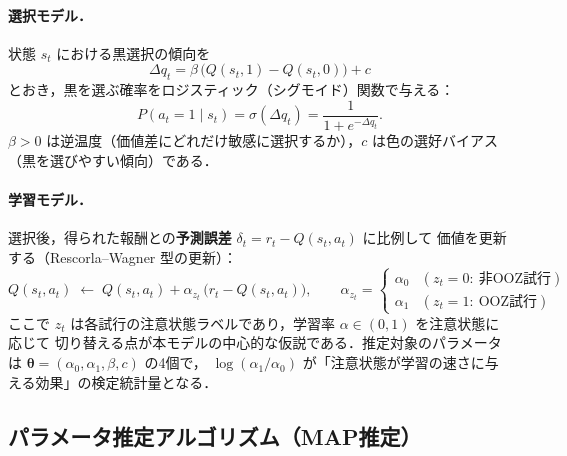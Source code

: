 \documentclass[a4paper,11pt]{jsarticle}
\begin{document}
\paragraph{選択モデル．}
状態 $s_t$ における黒選択の傾向を
\begin{equation}
  \Delta q_t = \beta\,\bigl(Q(s_t,1) - Q(s_t,0)\bigr) + c
\end{equation}
とおき，黒を選ぶ確率をロジスティック（シグモイド）関数で与える：
\begin{equation}
  P(a_t = 1 \mid s_t) = \sigma(\Delta q_t) = \frac{1}{1+e^{-\Delta q_t}} .
\end{equation}
$\beta > 0$ は逆温度（価値差にどれだけ敏感に選択するか），$c$ は色の選好バイアス
（黒を選びやすい傾向）である．

\paragraph{学習モデル．}
選択後，得られた報酬との\textbf{予測誤差} $\delta_t = r_t - Q(s_t,a_t)$ に比例して
価値を更新する（Rescorla--Wagner 型の更新）：
\begin{equation}
  Q(s_t,a_t) \;\leftarrow\; Q(s_t,a_t) + \alpha_{z_t}\,\bigl(r_t - Q(s_t,a_t)\bigr),
  \qquad
  \alpha_{z_t} =
  \begin{cases}
    \alpha_0 & (z_t = 0:\ \text{非OOZ試行}) \\
    \alpha_1 & (z_t = 1:\ \text{OOZ試行})
  \end{cases}
  \label{eq:update}
\end{equation}
ここで $z_t$ は各試行の注意状態ラベルであり，学習率 $\alpha \in (0,1)$ を注意状態に応じて
切り替える点が本モデルの中心的な仮説である．推定対象のパラメータは
$\bm{\theta} = (\alpha_0, \alpha_1, \beta, c)$ の4個で，
$\log(\alpha_1/\alpha_0)$ が「注意状態が学習の速さに与える効果」の検定統計量となる．

\subsection{パラメータ推定アルゴリズム（MAP推定）}
\end{document}
